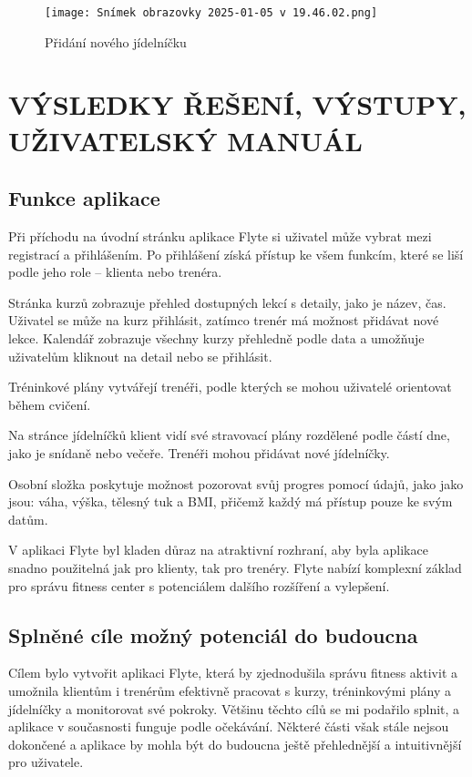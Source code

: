 \documentclass[12pt, a4paper,
twoside,        %
openany
]{report}
\begin{document}
\begin{figure}[h]
    \centering
    \texttt{[image: Snímek obrazovky 2025-01-05 v 19.46.02.png]}
    \caption{Přidání nového jídelníčku}
\end{figure}


\chapter{VÝSLEDKY ŘEŠENÍ, VÝSTUPY, UŽIVATELSKÝ MANUÁL}

\section{Funkce aplikace}
Při příchodu na úvodní stránku aplikace Flyte si uživatel může vybrat mezi registrací a přihlášením. Po přihlášení získá přístup ke všem funkcím, které se liší podle jeho role – klienta nebo trenéra.

Stránka kurzů zobrazuje přehled dostupných lekcí s detaily, jako je název, čas. Uživatel se může na kurz přihlásit, zatímco trenér má možnost přidávat nové lekce. Kalendář zobrazuje všechny kurzy přehledně podle data a umožňuje uživatelům kliknout na detail nebo se přihlásit.

Tréninkové plány vytvářejí trenéři, podle kterých se mohou uživatelé orientovat během cvičení.

Na stránce jídelníčků klient vidí své stravovací plány rozdělené podle částí dne, jako je snídaně nebo večeře. Trenéři mohou přidávat nové jídelníčky.

Osobní složka poskytuje možnost pozorovat svůj progres pomocí údajů, jako jako jsou: váha, výška, tělesný tuk a BMI, přičemž každý má přístup pouze ke svým datům. 

V aplikaci Flyte byl kladen důraz na atraktivní rozhraní, aby byla aplikace snadno použitelná jak pro klienty, tak pro trenéry. Flyte nabízí komplexní základ pro správu fitness center s potenciálem dalšího rozšíření a vylepšení.
 \vspace{18pt}
\clearpage
\section{Splněné cíle možný potenciál do budoucna}

Cílem bylo vytvořit aplikaci Flyte, která by zjednodušila správu fitness aktivit a umožnila klientům i trenérům efektivně pracovat s kurzy, tréninkovými plány a jídelníčky a monitorovat své pokroky. Většinu těchto cílů se mi podařilo splnit, a aplikace v současnosti funguje podle očekávání. Některé části však stále nejsou dokončené a aplikace by mohla být do budoucna ještě přehlednější a intuitivnější pro uživatele.
\end{document}
